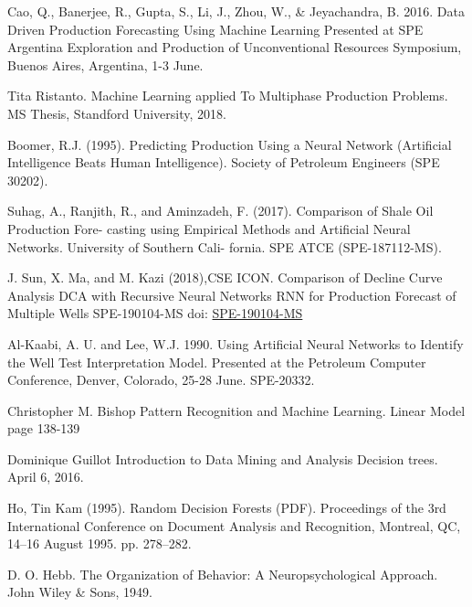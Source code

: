\documentclass[english]{article}
\begin{document}
\begin{thebibliography}{1}

Cao, Q., Banerjee, R., Gupta, S., Li, J., Zhou, W., \& Jeyachandra, B. 2016.
\newblock Data Driven Production Forecasting Using Machine Learning
\newblock Presented at SPE Argentina Exploration and Production of Unconventional Resources Symposium, Buenos Aires, Argentina, 1-3 June.

Tita Ristanto.
\newblock Machine Learning
applied To Multiphase Production Problems.
\newblock MS Thesis, Standford University, 2018.

Boomer, R.J. (1995).
\newblock Predicting Production Using a Neural Network (Artificial Intelligence Beats Human Intelligence).
\newblock Society of Petroleum Engineers (SPE 30202).

Suhag, A., Ranjith, R., and Aminzadeh, F. (2017).
\newblock Comparison of Shale Oil Production Fore- casting using Empirical Methods and Artificial Neural Networks.
\newblock University of Southern Cali- fornia. SPE ATCE (SPE-187112-MS).

J. Sun, X. Ma, and M. Kazi (2018),CSE ICON.
\newblock Comparison of Decline Curve Analysis DCA with Recursive Neural Networks RNN for Production Forecast of Multiple Wells
\newblock SPE-190104-MS doi: \href{https://doi.org/10.2118/190104-MS}{SPE-190104-MS}

Al-Kaabi, A. U. and Lee, W.J. 1990.
\newblock Using Artificial Neural Networks to Identify the Well Test Interpretation Model.
\newblock Presented at the Petroleum Computer Conference, Denver, Colorado, 25-28 June. SPE-20332.

Christopher M. Bishop
\newblock Pattern Recognition and Machine Learning.
\newblock Linear Model page 138-139
 
Dominique Guillot
\newblock Introduction to Data Mining and Analysis
Decision trees.
\newblock April 6, 2016.

Ho, Tin Kam (1995).
\newblock Random Decision Forests (PDF).
\newblock Proceedings of the 3rd International Conference on Document Analysis and Recognition, Montreal, QC, 14–16 August 1995. pp. 278–282.

D. O. Hebb.
\newblock The Organization of Behavior: A Neuropsychological Approach.
\newblock John Wiley \& Sons, 1949.
 

\end{thebibliography}
\end{document}
